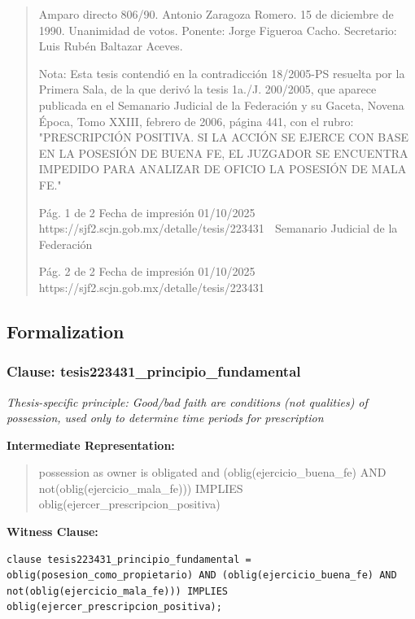 \documentclass[11pt,a4paper]{article}
\begin{document}
\begin{quote}
Amparo directo 806/90. Antonio Zaragoza Romero. 15 de diciembre de 1990. Unanimidad de votos.
Ponente: Jorge Figueroa Cacho. Secretario: Luis Rubén Baltazar Aceves.

Nota: Esta tesis contendió en la contradicción 18/2005-PS resuelta por la Primera Sala, de la que
derivó la tesis 1a./J. 200/2005, que aparece publicada en el Semanario Judicial de la Federación y
su Gaceta, Novena Época, Tomo XXIII, febrero de 2006, página 441, con el rubro:
"PRESCRIPCIÓN POSITIVA. SI LA ACCIÓN SE EJERCE CON BASE EN LA POSESIÓN DE
BUENA FE, EL JUZGADOR SE ENCUENTRA IMPEDIDO PARA ANALIZAR DE OFICIO LA
POSESIÓN DE MALA FE."




                                               Pág. 1 de 2              Fecha de impresión 01/10/2025
  https://sjf2.scjn.gob.mx/detalle/tesis/223431
                                                Semanario Judicial de la Federación




                                           Pág. 2 de 2       Fecha de impresión 01/10/2025
https://sjf2.scjn.gob.mx/detalle/tesis/223431

\end{quote}

\subsection{Formalization}

\subsubsection{Clause: tesis223431\_principio\_fundamental}

\textit{Thesis-specific principle: Good/bad faith are conditions (not qualities) of possession, used only to determine time periods for prescription}

\textbf{Intermediate Representation:}

\begin{quote}
possession as owner is obligated and (oblig(ejercicio\_buena\_fe) AND not(oblig(ejercicio\_mala\_fe))) IMPLIES oblig(ejercer\_prescripcion\_positiva)
\end{quote}

\textbf{Witness Clause:}

\begin{lstlisting}[style=witnessstyle, language=Witness]
clause tesis223431_principio_fundamental = oblig(posesion_como_propietario) AND (oblig(ejercicio_buena_fe) AND not(oblig(ejercicio_mala_fe))) IMPLIES oblig(ejercer_prescripcion_positiva);
\end{lstlisting}
\end{document}
